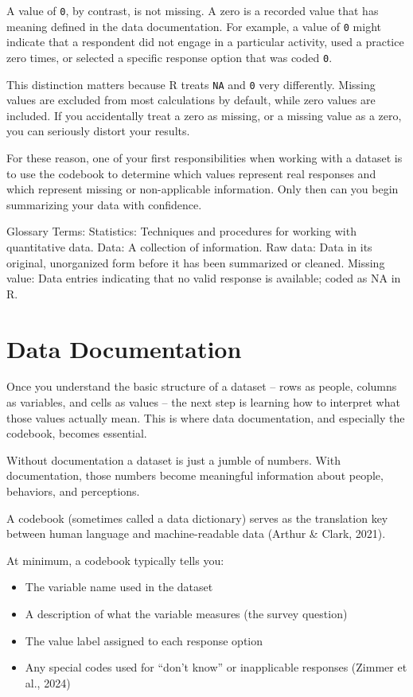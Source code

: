 \documentclass[
  letterpaper,
  DIV=11,
  numbers=noendperiod]{scrreprt}
\providecommand{\tightlist}{%
  \setlength{\itemsep}{0pt}\setlength{\parskip}{0pt}}
\begin{document}
A value of \texttt{0}, by contrast, is not missing. A zero is a recorded
value that has meaning defined in the data documentation. For example, a
value of \texttt{0} might indicate that a respondent did not engage in a
particular activity, used a practice zero times, or selected a specific
response option that was coded \texttt{0}.

This distinction matters because R treats \texttt{NA} and \texttt{0}
very differently. Missing values are excluded from most calculations by
default, while zero values are included. If you accidentally treat a
zero as missing, or a missing value as a zero, you can seriously distort
your results.

For these reason, one of your first responsibilities when working with a
dataset is to use the codebook to determine which values represent real
responses and which represent missing or non-applicable information.
Only then can you begin summarizing your data with confidence.

Glossary Terms: Statistics: Techniques and procedures for working with
quantitative data. Data: A collection of information. Raw data: Data in
its original, unorganized form before it has been summarized or cleaned.
Missing value: Data entries indicating that no valid response is
available; coded as NA in R.

\section{Data Documentation}\label{data-documentation}

Once you understand the basic structure of a dataset -- rows as people,
columns as variables, and cells as values -- the next step is learning
how to interpret what those values actually mean. This is where data
documentation, and especially the codebook, becomes essential.

Without documentation a dataset is just a jumble of numbers. With
documentation, those numbers become meaningful information about people,
behaviors, and perceptions.

A codebook (sometimes called a data dictionary) serves as the
translation key between human language and machine-readable data (Arthur
\& Clark, 2021).

At minimum, a codebook typically tells you:

\begin{itemize}
\tightlist
\item
  The variable name used in the dataset
\item
  A description of what the variable measures (the survey question)
\item
  The value label assigned to each response option
\item
  Any special codes used for ``don't know'' or inapplicable responses
  (Zimmer et al., 2024)
\end{itemize}
\end{document}
